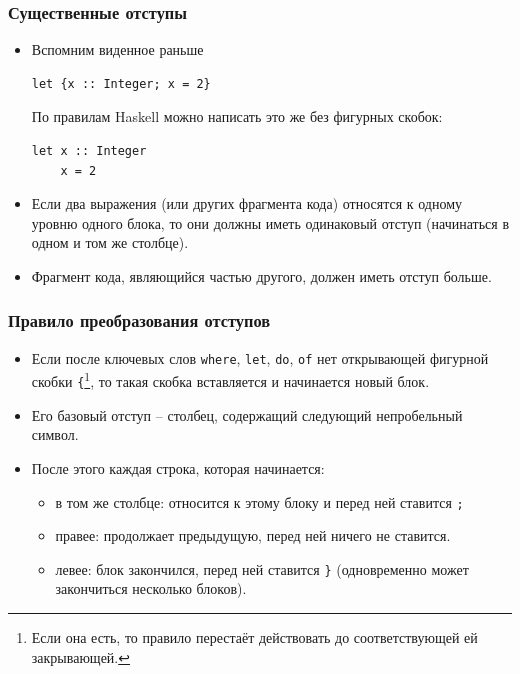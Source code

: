 \documentclass[11pt]{beamer}
\begin{document}
\begin{frame}[fragile]
\frametitle{Существенные отступы}
\begin{itemize}
    \item Вспомним виденное раньше
\begin{lstlisting}
let {x :: Integer; x = 2}
\end{lstlisting}
По правилам Haskell можно написать это же без фигурных скобок:
\begin{lstlisting}
let x :: Integer
    x = 2
\end{lstlisting}
\item Если два выражения (или других фрагмента кода) относятся к одному уровню одного блока, то они должны иметь одинаковый отступ (начинаться в одном и том же столбце).
\item Фрагмент кода, являющийся частью другого, должен иметь отступ больше.
\end{itemize}
\end{frame}
\begin{frame}[fragile]
\frametitle{Правило преобразования отступов}
\begin{itemize}
\item Если после ключевых слов \lstinline|where|, \lstinline|let|, \lstinline|do|, \lstinline|of| нет открывающей фигурной скобки \lstinline|{|\footnote{Если она есть, то правило перестаёт действовать до соответствующей ей закрывающей.}, то такая скобка вставляется и начинается новый блок.
\item Его базовый отступ -- столбец, содержащий следующий непробельный символ. 
\item После этого каждая строка, которая начинается:
\begin{itemize}
    \item в том же столбце: относится к этому блоку и перед ней ставится \lstinline|;|
    \item правее: продолжает предыдущую, перед ней ничего не ставится.
    \item левее: блок закончился, перед ней ставится \lstinline|}| (одновременно может закончиться несколько блоков).
\end{itemize}
\end{itemize}
\end{frame}
\end{document}
